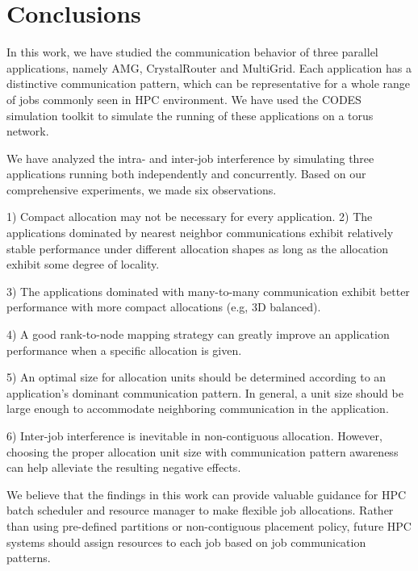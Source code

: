 \section{Conclusions}
\label{sec:conclusion}
In this work, we have studied the communication behavior of three parallel applications, 
namely AMG, CrystalRouter and MultiGrid. 
Each application has a distinctive communication pattern, 
which can be representative for a whole range of jobs commonly seen in HPC environment. 
We have used the CODES simulation toolkit  
to simulate the running of these applications on a torus network. 

We have analyzed the intra- and inter-job interference by simulating three applications
running both independently and concurrently.
Based on our comprehensive experiments, we made six observations. 

1) Compact allocation may not be necessary for every application.   
2) The applications dominated by nearest neighbor communications exhibit 
    relatively stable performance under different allocation shapes as long as
    the allocation exhibit some degree of locality.
    
3) The applications dominated with many-to-many communication exhibit 
    better performance with more compact allocations (e.g, 3D balanced).
    
4) A good rank-to-node mapping strategy can greatly improve 
    an application performance when a specific allocation is given.
    
5) An optimal size for allocation units should be determined 
    according to an application's dominant communication pattern. 
    In general, a unit size should be large enough to accommodate  
    neighboring communication in the application. 
    
6) Inter-job interference is inevitable in non-contiguous allocation. 
    However, choosing the proper allocation unit size with communication 
    pattern awareness can help alleviate the resulting negative effects. 

We believe that the findings in this work can provide valuable guidance 
for HPC batch scheduler and resource manager to make flexible job allocations. 
Rather than using pre-defined partitions or non-contiguous placement policy, 
future HPC systems should assign resources to each job based on job communication patterns. 


